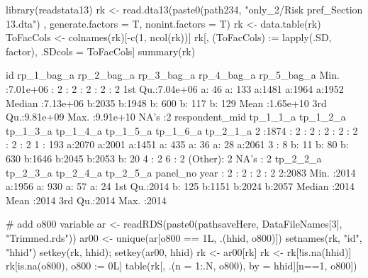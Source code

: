 \begin{Schunk}
\begin{Sinput}
library(readstata13)
rk <- read.dta13(paste0(path234, "only_2/Risk pref_Section 13.dta")
  , generate.factors = T, nonint.factors = T)
rk <- data.table(rk)
ToFacCols <- colnames(rk)[-c(1, ncol(rk))]
rk[, (ToFacCols) := lapply(.SD, factor), .SDcols = ToFacCols]
summary(rk)
\end{Sinput}
\begin{Soutput}
       id           rp_1_bag_a rp_2_bag_a rp_3_bag_a rp_4_bag_a rp_5_bag_a
 Min.   :7.01e+06    :   2      :   2      :   2      :   2      :   2    
 1st Qu.:7.04e+06   a:  46     a: 133     a:1481     a:1964     a:1952    
 Median :7.13e+06   b:2035     b:1948     b: 600     b: 117     b: 129    
 Mean   :1.65e+10                                                         
 3rd Qu.:9.81e+09                                                         
 Max.   :9.91e+10                                                         
 NA's   :2                                                                
 respondent_mid tp_1_1_a tp_1_2_a tp_1_3_a tp_1_4_a tp_1_5_a tp_1_6_a tp_2_1_a
 2      :1874    :   2    :   2    :   2    :   2    :   2    :   2    :   2  
 1      : 193   a:2070   a:2001   a:1451   a: 435   a:  36   a:  28   a:2061  
 3      :   8   b:  11   b:  80   b: 630   b:1646   b:2045   b:2053   b:  20  
 4      :   2                                                                 
 6      :   2                                                                 
 (Other):   2                                                                 
 NA's   :   2                                                                 
 tp_2_2_a tp_2_3_a tp_2_4_a tp_2_5_a panel_no      year     
  :   2    :   2    :   2    :   2   2:2083   Min.   :2014  
 a:1956   a: 930   a:  57   a:  24            1st Qu.:2014  
 b: 125   b:1151   b:2024   b:2057            Median :2014  
                                              Mean   :2014  
                                              3rd Qu.:2014  
                                              Max.   :2014  
                                                            
\end{Soutput}
\begin{Sinput}
# add o800 variable
ar <- readRDS(paste0(pathsaveHere, DataFileNames[3], "Trimmed.rds"))
ar00 <- unique(ar[o800 == 1L, .(hhid, o800)])
setnames(rk, "id", "hhid")
setkey(rk, hhid); setkey(ar00, hhid)
rk <- ar00[rk]
rk <- rk[!is.na(hhid)]
rk[is.na(o800), o800 := 0L]
table(rk[, .(n = 1:.N, o800), by = hhid][n==1, o800])
\end{Sinput}
\begin{Soutput}


\end{Soutput}
\end{Schunk}
